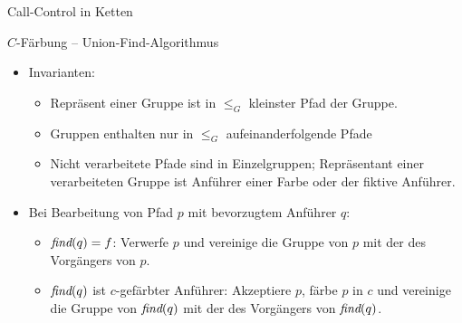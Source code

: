 \begin{section}{Call-Control in Ketten}
\begin{frame}{$C$-Färbung -- Union-Find-Algorithmus}
\begin{itemize}
	\item Invarianten:
	\begin{itemize}
		\pause\item Repräsent einer Gruppe ist in $\leq_G$ kleinster Pfad der Gruppe.
		\pause\item Gruppen enthalten nur in $\leq_G$ aufeinanderfolgende Pfade
		\pause\item Nicht verarbeitete Pfade sind in Einzelgruppen; Repräsentant einer verarbeiteten Gruppe ist Anführer einer Farbe oder der fiktive Anführer.
	\end{itemize}
	\pause\item Bei Bearbeitung von Pfad $p$ mit bevorzugtem Anführer $q$:
	\begin{itemize}
		\pause\item $\text{\em find}(q)=f$: Verwerfe $p$ und vereinige die Gruppe von $p$ mit der des Vorgängers von $p$.
		\pause\item $\text{\em find}(q)$ ist $c$-gefärbter Anführer: Akzeptiere $p$, färbe $p$ in $c$ und vereinige die Gruppe von $\text{\em find}(q)$ mit der des Vorgängers von $\text{\em find}(q)$.
	\end{itemize}
\end{itemize}
\end{frame}


\end{section}
